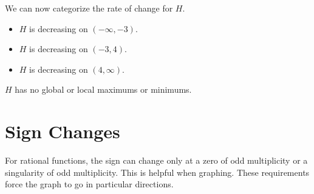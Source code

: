\documentclass{ximera}
\begin{document}
\begin{example}
We can now categorize the rate of change for $H$.

\begin{itemize}
\item $H$ is decreasing on $(-\infty, -3)$.
\item $H$ is decreasing on $(-3, 4)$.
\item $H$ is decreasing on $(4,\infty)$.
\end{itemize}

$H$ has no global or local maximums or minimums.


\end{example}







\section{Sign Changes}

For rational functions, the sign can change only at a zero of odd multiplicity or a singularity of odd multiplicity. This is helpful when graphing. These requirements force the graph to go in particular directions.
\end{document}
